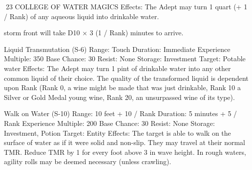 \documentclass[a4paper]{article}
\begin{document}
\begin{multicols}{3}
23 COLLEGE OF WATER MAGICS
Effects: The Adept may turn 1 quart (+ 1 / Rank) of
any aqueous liquid into drinkable water.

storm front will take D10 × 3 (1 / Rank) minutes to
arrive.

Liquid Transmutation (S-6)
Range: Touch
Duration: Immediate
Experience Multiple: 350
Base Chance: 30%
Resist: None
Storage: Investment
Target: Potable water
Effects: The Adept may turn 1 pint of drinkable
water into any other common liquid of their choice.
The quality of the transformed liquid is dependent
upon Rank (Rank 0, a wine might be made that
was just drinkable, Rank 10 a Silver or Gold Medal
young wine, Rank 20, an unsurpassed wine of its
type).

Walk on Water (S-10)
Range: 10 feet + 10 / Rank
Duration: 5 minutes + 5 / Rank
Experience Multiple: 200
Base Chance: 30%
Resist: None
Storage: Investment, Potion
Target: Entity
Effects: The target is able to walk on the surface of
water as if it were solid and non-slip. They may
travel at their normal TMR. Reduce TMR by 1 for
every foot above 3 in wave height. In rough waters,
agility rolls may be deemed necessary (unless
crawling).


\end{multicols}
\end{document}
